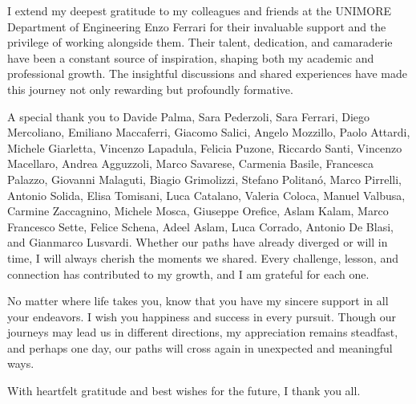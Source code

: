 I extend my deepest gratitude to my colleagues and friends at the UNIMORE Department of Engineering Enzo Ferrari for their invaluable support and the privilege of working alongside them. Their talent, dedication, and camaraderie have been a constant source of inspiration, shaping both my academic and professional growth. The insightful discussions and shared experiences have made this journey not only rewarding but profoundly formative.

A special thank you to Davide Palma, Sara Pederzoli, Sara Ferrari, Diego Mercoliano, Emiliano Maccaferri, Giacomo Salici, Angelo Mozzillo, Paolo Attardi, Michele Giarletta, Vincenzo Lapadula, Felicia Puzone, Riccardo Santi, Vincenzo Macellaro, Andrea Agguzzoli, Marco Savarese, Carmenia Basile, Francesca Palazzo, Giovanni Malaguti, Biagio Grimolizzi, Stefano Politanó, Marco Pirrelli, Antonio Solida, Elisa Tomisani, Luca Catalano, Valeria Coloca, Manuel Valbusa, Carmine Zaccagnino, Michele Mosca, Giuseppe Orefice, Aslam Kalam, Marco Francesco Sette, Felice Schena, Adeel Aslam, Luca Corrado, Antonio De Blasi, and Gianmarco Lusvardi. Whether our paths have already diverged or will in time, I will always cherish the moments we shared. Every challenge, lesson, and connection has contributed to my growth, and I am grateful for each one.

No matter where life takes you, know that you have my sincere support in all your endeavors. I wish you happiness and success in every pursuit. Though our journeys may lead us in different directions, my appreciation remains steadfast, and perhaps one day, our paths will cross again in unexpected and meaningful ways.

With heartfelt gratitude and best wishes for the future, I thank you all.
